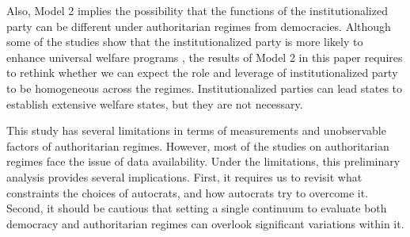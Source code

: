 \documentclass[12pt, letterpage, notitlepage]{article}
\begin{document}
Also, Model 2 implies the possibility that the functions of the institutionalized party can be different under authoritarian regimes from democracies. Although some of the studies show that the institutionalized party is more likely to enhance universal welfare programs \citep{Rasmussen2019}, the results of Model 2 in this paper requires to rethink whether we can expect the role and leverage of institutionalized party to be homogeneous across the regimes. Institutionalized parties can lead states to establish extensive welfare states, but they are not necessary.


This study has several limitations in terms of measurements and unobservable factors of authoritarian regimes. However, most of the studies on authoritarian regimes face the issue of data availability. Under the limitations, this preliminary analysis provides several implications. First, it requires us to revisit what constraints the choices of autocrats, and how autocrats try to overcome it. Second, it should be cautious that setting a single continuum to evaluate both democracy and authoritarian regimes can overlook significant variations within it.


\newpage


\end{document}
